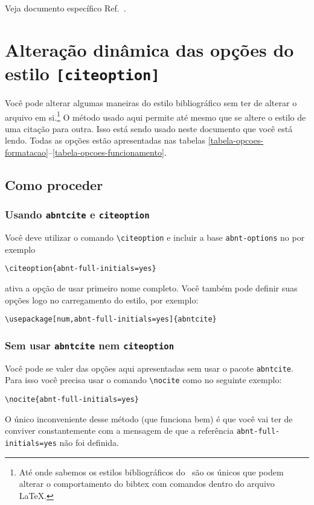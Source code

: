 \documentclass[espacosimples]{abnt}
\begin{document}
Veja documento específico Ref.~.

\chapter{Alteração dinâmica das opções do estilo {\tt [citeoption]}}
\label{chapter-opcoes-estilo}
Você pode alterar algumas maneiras do estilo bibliográfico
sem ter de alterar o arquivo em si.\footnote{Até onde sabemos
os estilos bibliográficos do \abnTeX\ são os únicos que podem
alterar o comportamento do bibtex com comandos dentro do arquivo
\LaTeX.}
O método usado aqui permite até
mesmo que se altere o estilo de uma citação para outra.
Isso está sendo usado neste documento que você está lendo.
Todas as opções estão apresentadas nas tabelas \ref{tabela-opcoes-formatacao}--\ref{tabela-opcoes-funcionamento}.

\section{Como proceder}

\subsection{Usando {\tt abntcite} e {\tt citeoption}}

Você deve utilizar o comando \verb+\citeoption+ e
incluir a base {\tt abnt-options} no \verb++
por exemplo
\begin{verbatim}
\citeoption{abnt-full-initials=yes}
\end{verbatim}
ativa a opção de usar primeiro nome completo.
Você também pode definir suas opções logo no carregamento do estilo,
por exemplo:
\begin{verbatim}
\usepackage[num,abnt-full-initials=yes]{abntcite}
\end{verbatim}

\subsection{Sem usar {\tt abntcite} nem {\tt citeoption}}

Você pode se valer das opções aqui apresentadas sem usar o pacote {\tt abntcite}.
Para isso você precisa usar o comando \verb+\nocite+ como no seguinte
exemplo:
\begin{verbatim}
\nocite{abnt-full-initials=yes}
\end{verbatim}
O único inconveniente desse método (que funciona bem) é que você vai ter
de conviver constantemente com a mensagem de que a referência {\tt abnt-full-initials=yes}
não foi definida.
\end{document}
